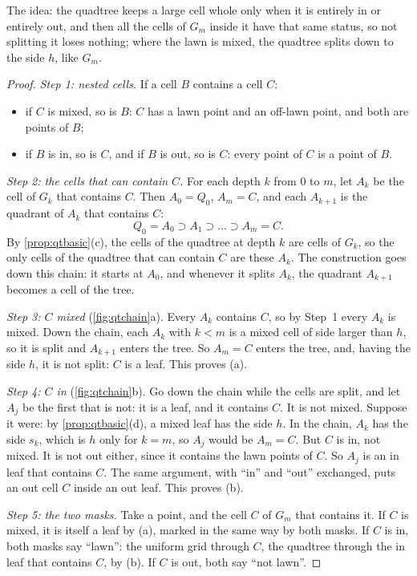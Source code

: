 The idea: the quadtree keeps a large cell whole only when it is entirely
in or entirely out, and then all the cells of $G_m$ inside it have that
same status, so not splitting it loses nothing; where the lawn is mixed,
the quadtree splits down to the side $h$, like $G_m$.

\begin{proof}
\emph{Step 1: nested cells.} If a cell $B$ contains a cell $C$:
\begin{itemize}[nosep]
  \item if $C$ is mixed, so is $B$: $C$ has a lawn point and an off-lawn
        point, and both are points of $B$;
  \item if $B$ is in, so is $C$, and if $B$ is out, so is $C$: every point
        of $C$ is a point of $B$.
\end{itemize}

\emph{Step 2: the cells that can contain $C$.} For each depth $k$ from
$0$ to $m$, let $A_k$ be the cell of $G_k$ that contains $C$. Then
$A_0=Q_0$, $A_m=C$, and each $A_{k+1}$ is the quadrant of $A_k$ that
contains $C$:
\[
  Q_0=A_0\supset A_1\supset\dots\supset A_m=C .
\]
By \cref{prop:qtbasic}(c), the cells of the quadtree at depth $k$ are
cells of $G_k$, so the only cells of the quadtree that can contain $C$
are these $A_k$. The construction goes down this chain: it starts at
$A_0$, and whenever it splits $A_k$, the quadrant $A_{k+1}$ becomes a
cell of the tree.

\emph{Step 3: $C$ mixed} (\cref{fig:qtchain}a). Every $A_k$ contains $C$,
so by Step~1 every $A_k$ is mixed. Down the chain, each $A_k$ with $k<m$
is a mixed cell of side larger than $h$, so it is split and $A_{k+1}$
enters the tree. So $A_m=C$ enters the tree, and, having the side $h$, it
is not split: $C$ is a leaf. This proves (a).

\emph{Step 4: $C$ in} (\cref{fig:qtchain}b). Go down the chain while the
cells are split, and let $A_j$ be the first that is not: it is a leaf,
and it contains $C$. It is not mixed. Suppose it were: by \cref{prop:qtbasic}(d), a mixed
leaf has the side $h$. In the chain, $A_k$ has the side $s_k$, which is
$h$ only for $k=m$, so $A_j$ would be $A_m=C$. But $C$ is in, not
mixed. It is
not out either, since it contains the lawn points of $C$. So $A_j$ is an
in leaf that contains $C$. The same argument, with ``in'' and ``out''
exchanged, puts an out cell $C$ inside an out leaf. This proves (b).

\emph{Step 5: the two masks.} Take a point, and the cell $C$ of $G_m$
that contains it. If $C$ is mixed, it is itself a leaf by (a), marked in
the same way by both masks. If $C$ is in, both masks say ``lawn'': the
uniform grid through $C$, the quadtree through the in leaf that contains
$C$, by (b). If $C$ is out, both say ``not lawn''.
\end{proof}


